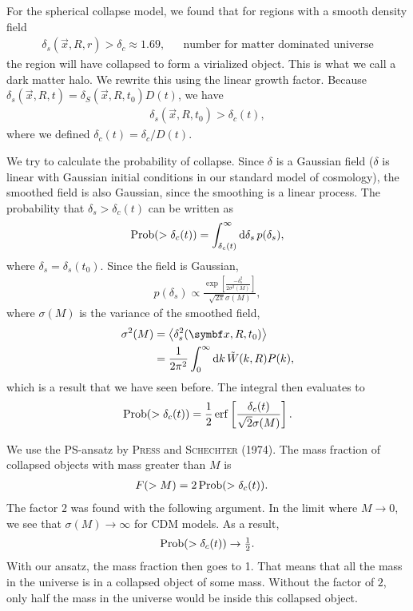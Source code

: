 For the spherical collapse model, we found that for regions with a smooth density field
\begin{align*}
	\delta_s(\vec{x}, R, r) > \delta_c \approx 1.69,
	&&\text{number for matter dominated universe}
\end{align*}
the region will have collapsed to form a virialized object.
This is what we call a dark matter halo.
We rewrite this using the linear growth factor.
Because $\delta_s(\vec{x}, R, t) = \delta_S(\vec{x}, R, t_0) D(t)$, we have
\begin{align*}
	\delta_s(\vec{x}, R, t_0)
	> \delta_c(t),
\end{align*}
where we defined $\delta_c(t) = \delta_c / D(t)$.

We try to calculate the probability of collapse.
Since $\delta$ is a Gaussian field
($\delta$ is linear with Gaussian initial conditions in our standard model of cosmology),
the smoothed field is also Gaussian, since the smoothing is a linear process.
The probability that $\delta_s > \delta_c(t)$ can be written as
\begin{align*}
	\operatorname{Prob}(>\delta_c(t))
	= \int_{\delta_c(t)}^{\infty}
	\dd{\delta_s}
	p(\delta_s),
\end{align*}
where $\delta_s = \delta_s(t_0)$.
Since the field is Gaussian,
\begin{align*}
	p(\delta_s)
	\propto
	\frac{
		\exp \left[
			\frac{-\delta_s^2}{2 \sigma^2(M)}
		\right]
	}{
		\sqrt{2\pi} \sigma(M)
	},
\end{align*}
where $\sigma(M)$ is the variance of the smoothed field,
\begin{align*}
	\sigma^2(M)
	&= \avg{\delta_s^2(\vec{x}, R, t_0)}\\
	&= \frac{1}{2\pi^2} \int_0^\infty \dd{k} \tilde{W}(k, R) P(k),
\end{align*}
which is a result that we have seen before.
The integral then evaluates to
\begin{align*}
	\Prob(>\delta_c(t))
	= \frac{1}{2} \erf
	\left[ \frac{\delta_c(t)}{\sqrt{2} \sigma(M)} \right].
\end{align*}

We use the PS-ansatz by \textsc{Press} and \textsc{Schechter} (1974).
The mass fraction of collapsed objects with mass greater than $M$ is
\begin{align*}
	F(>M)
	&= 2 \operatorname{Prob}(>\delta_c(t)).
\end{align*}
The factor $2$ was found with the following argument.
In the limit where $M \to 0$, we see that $\sigma(M) \to \infty$ for CDM models.
As a result,
\begin{align*}
	\operatorname{Prob}(>\delta_c(t)) \to \tfrac{1}{2}.
\end{align*}
With our ansatz, the mass fraction then goes to 1.
That means that all the mass in the universe is in a collapsed object of some mass.
Without the factor of $2$, only half the mass in the universe would be inside this collapsed object.

